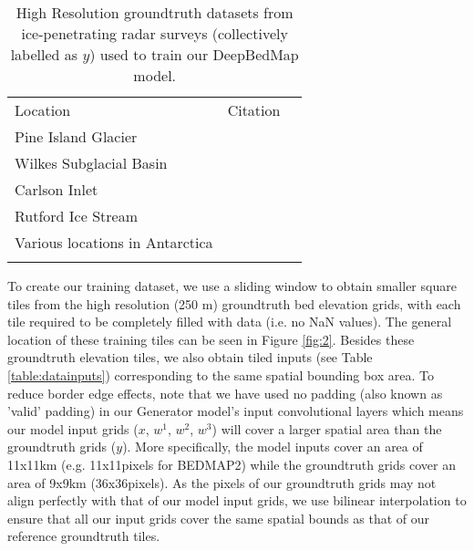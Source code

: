 \documentclass[tc, manuscript]{copernicus}
\begin{document}
\begin{table*}[ht]
\caption{High Resolution groundtruth datasets from ice-penetrating radar surveys (collectively labelled as $y$) used to train our DeepBedMap model.}
\label{table:groundtruthdata}
\begin{tabular}{lcr}
\tophline
Location & Citation \\
\middlehline
Pine Island Glacier & \cite{BinghamDiverselandscapesPine2017} \\
Wilkes Subglacial Basin & \cite{JordanHypothesismegaoutburstflooding2010} \\
Carlson Inlet & \cite{KingIcestreamnot2011} \\
Rutford Ice Stream & \cite{KingSubglaciallandformsRutford2016} \\
Various locations in Antarctica & \cite{ShiMultichannelCoherentRadar2010} \\
\bottomhline
\end{tabular}
\belowtable{} %
\end{table*}

To create our training dataset, we use a sliding window to obtain smaller square tiles from the high resolution (250 m) groundtruth bed elevation grids, with each tile required to be completely filled with data (i.e. no NaN values).
The general location of these training tiles can be seen in Figure \ref{fig:2}.
Besides these groundtruth elevation tiles, we also obtain tiled inputs (see Table \ref{table:datainputs}) corresponding to the same spatial bounding box area.
To reduce border edge effects, note that we have used no padding (also known as 'valid' padding) in our Generator model's input convolutional layers which means our model input grids ($x$, $w^1$, $w^2$, $w^3$) will cover a larger spatial area than the groundtruth grids ($y$).
More specifically, the model inputs cover an area of 11x11km (e.g. 11x11pixels for BEDMAP2) while the groundtruth grids cover an area of 9x9km (36x36pixels).
As the pixels of our groundtruth grids may not align perfectly with that of our model input grids, we use bilinear interpolation to ensure that all our input grids cover the same spatial bounds as that of our reference groundtruth tiles.
\end{document}

